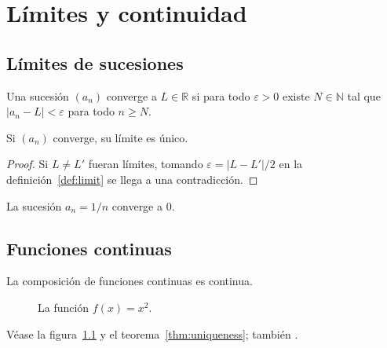 \chapter{Límites y continuidad}

\section{Límites de sucesiones}

\begin{definition}\label{def:limit}
Una sucesión $(a_n)$ converge a $L\in\mathbb{R}$ si para todo $\varepsilon>0$
existe $N\in\mathbb{N}$ tal que $|a_n-L|<\varepsilon$ para todo $n\ge N$.
\end{definition}

\begin{theorem}\label{thm:uniqueness}
Si $(a_n)$ converge, su límite es único.
\end{theorem}
\begin{proof}
Si $L\neq L'$ fueran límites, tomando $\varepsilon=|L-L'|/2$ en la
definición~\ref{def:limit} se llega a una contradicción.
\end{proof}

\begin{example}
La sucesión $a_n = 1/n$ converge a $0$.
\end{example}

\section{Funciones continuas}

\begin{lemma}\label{lem:comp}
La composición de funciones continuas es continua.
\end{lemma}

\begin{figure}[ht]
\centering
{}
\caption{La función $f(x)=x^2$.}\label{fig:parabola}
\end{figure}

Véase la figura~\ref{fig:parabola} y el teorema~\ref{thm:uniqueness}; también \cite{rudin,cauchy}.
